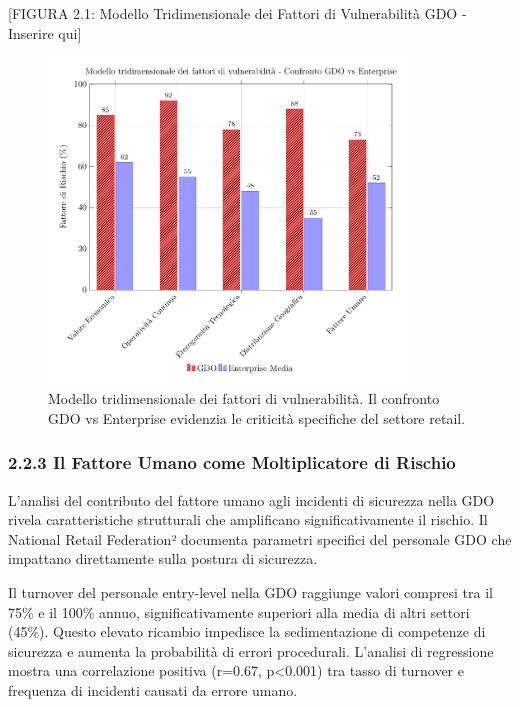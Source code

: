 \documentclass{report}
\begin{document}
{[}FIGURA 2.1: Modello Tridimensionale dei Fattori di Vulnerabilità GDO
- Inserire qui{]}
\begin{figure}[htbp]
    \centering
    \includegraphics[width=0.85\textwidth]{figura 2-1}
    \caption{Modello tridimensionale dei fattori di vulnerabilità. Il confronto GDO vs Enterprise evidenzia le criticità specifiche del settore retail.}
    \label{fig:vulnerabilita_gdo}
\end{figure}

\subsubsection{2.2.3 Il Fattore Umano come Moltiplicatore di
Rischio}\label{il-fattore-umano-come-moltiplicatore-di-rischio}

L'analisi del contributo del fattore umano agli incidenti di sicurezza
nella GDO rivela caratteristiche strutturali che amplificano
significativamente il rischio. Il National Retail Federation² documenta
parametri specifici del personale GDO che impattano direttamente sulla
postura di sicurezza.

Il turnover del personale entry-level nella GDO raggiunge valori
compresi tra il 75\% e il 100\% annuo, significativamente superiori alla
media di altri settori (45\%). Questo elevato ricambio impedisce la
sedimentazione di competenze di sicurezza e aumenta la probabilità di
errori procedurali. L'analisi di regressione mostra una correlazione
positiva (r=0.67, p\textless0.001) tra tasso di turnover e frequenza di
incidenti causati da errore umano.
\end{document}
